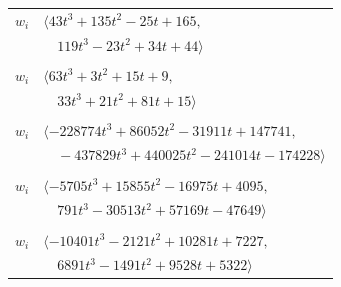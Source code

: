 \documentclass[11pt]{article}
\begin{document}
\begin{longtable}{@{}ll@{}}
$w_i$ & $\langle 43t^{3}+135t^{2}-25t+165,$\\
 & $\quad 119t^{3}-23t^{2}+34t+44\rangle$\\
\addlinespace[2pt]
\multicolumn{2}{@{}p{0.97\textwidth}@{}}{$i=23$, $D_i=4$, $\rho_{ij}$: $12{:}1, \allowbreak 14{:}1, \allowbreak 29{:}1, \allowbreak 37{:}2, \allowbreak 41{:}1, \allowbreak 46{:}1, \allowbreak 49{:}2, \allowbreak 61{:}2, \allowbreak 71{:}1$}\\
$w_i$ & $\langle 63t^{3}+3t^{2}+15t+9,$\\
 & $\quad 33t^{3}+21t^{2}+81t+15\rangle$\\
\addlinespace[2pt]
\multicolumn{2}{@{}p{0.97\textwidth}@{}}{$i=24$, $D_i=128$, $\rho_{ij}$: $1{:}1, \allowbreak 6{:}1, \allowbreak 8{:}2, \allowbreak 9{:}2, \allowbreak 10{:}1, \allowbreak 11{:}1, \allowbreak 30{:}2, \allowbreak 32{:}1, \allowbreak 37{:}2, \allowbreak 42{:}2, \allowbreak 44{:}2, \allowbreak 45{:}1, \allowbreak 50{:}1, \allowbreak 60{:}2, \allowbreak 61{:}2, \allowbreak 67{:}1, \allowbreak 70{:}2$}\\
$w_i$ & $\langle -228774t^{3}+86052t^{2}-31911t+147741,$\\
 & $\quad -437829t^{3}+440025t^{2}-241014t-174228\rangle$\\
\addlinespace[2pt]
\multicolumn{2}{@{}p{0.97\textwidth}@{}}{$i=25$, $D_i=64$, $\rho_{ij}$: $1{:}1, \allowbreak 5{:}1, \allowbreak 8{:}2, \allowbreak 10{:}1, \allowbreak 14{:}2, \allowbreak 19{:}1, \allowbreak 26{:}2, \allowbreak 34{:}1, \allowbreak 38{:}2, \allowbreak 41{:}2, \allowbreak 43{:}1, \allowbreak 45{:}1, \allowbreak 46{:}1, \allowbreak 47{:}1, \allowbreak 58{:}2, \allowbreak 59{:}1, \allowbreak 60{:}1, \allowbreak 66{:}1, \allowbreak 71{:}1$}\\
$w_i$ & $\langle -5705t^{3}+15855t^{2}-16975t+4095,$\\
 & $\quad 791t^{3}-30513t^{2}+57169t-47649\rangle$\\
\addlinespace[2pt]
\multicolumn{2}{@{}p{0.97\textwidth}@{}}{$i=26$, $D_i=16$, $\rho_{ij}$: $5{:}2, \allowbreak 7{:}1, \allowbreak 8{:}2, \allowbreak 14{:}2, \allowbreak 18{:}2, \allowbreak 25{:}1, \allowbreak 29{:}2, \allowbreak 30{:}1, \allowbreak 31{:}1, \allowbreak 32{:}1, \allowbreak 33{:}2, \allowbreak 35{:}2, \allowbreak 37{:}1, \allowbreak 42{:}2, \allowbreak 44{:}2, \allowbreak 47{:}1, \allowbreak 54{:}1, \allowbreak 70{:}2$}\\
$w_i$ & $\langle -10401t^{3}-2121t^{2}+10281t+7227,$\\
 & $\quad 6891t^{3}-1491t^{2}+9528t+5322\rangle$\\

\end{longtable}
\end{document}

